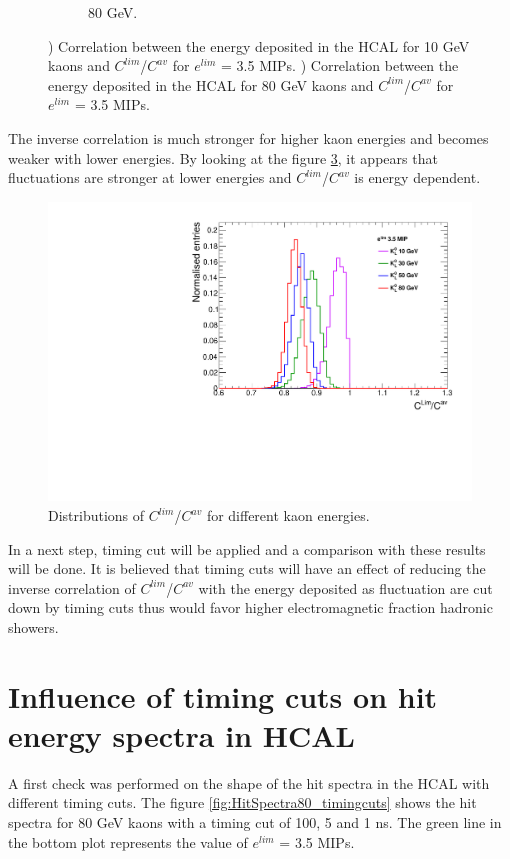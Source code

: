 \begin{figure}[htbp!]
\begin{subfigure}[t]{0.45\textwidth}
    \caption{80 GeV.} \label{fig:EhcalCLimCav80_100ns}
  \end{subfigure}
  \caption{) Correlation between the energy deposited in the HCAL for 10 GeV kaons and $C^{lim}$/$C^{av}$ for $e^{lim}$ = 3.5 MIPs. ) Correlation between the energy deposited in the HCAL for 80 GeV kaons and $C^{lim}$/$C^{av}$ for $e^{lim}$ = 3.5 MIPs.}
\end{figure}

The inverse correlation is much stronger for higher kaon energies and becomes weaker with lower energies. By looking at the figure \ref{fig:CLimCav_100ns}, it appears that fluctuations are stronger at lower energies and $C^{lim}$/$C^{av}$ is energy dependent.

\begin{figure}[htbp!]
  \centering
  \includegraphics[width=0.7\linewidth]{../Thesis_Plots/ILD/AdditionalPlots/Plots/CLimCav_100ns_SeveralEnergies.pdf}
  \caption{Distributions of $C^{lim}$/$C^{av}$ for different kaon energies.} \label{fig:CLimCav_100ns}
\end{figure}

In a next step, timing cut will be applied and a comparison with these results will be done. It is believed that timing cuts will have an effect of reducing the inverse correlation of $C^{lim}$/$C^{av}$ with the energy deposited as fluctuation are cut down by timing cuts thus would favor higher electromagnetic fraction hadronic showers.

\section{Influence of timing cuts on hit energy spectra in HCAL}

A first check was performed on the shape of the hit spectra in the HCAL with different timing cuts. The figure \ref{fig:HitSpectra80_timingcuts} shows the hit spectra for 80 GeV kaons with a timing cut of 100, 5 and 1 ns. The green line in the bottom plot represents the value of $e^{lim}$ = 3.5 MIPs.

